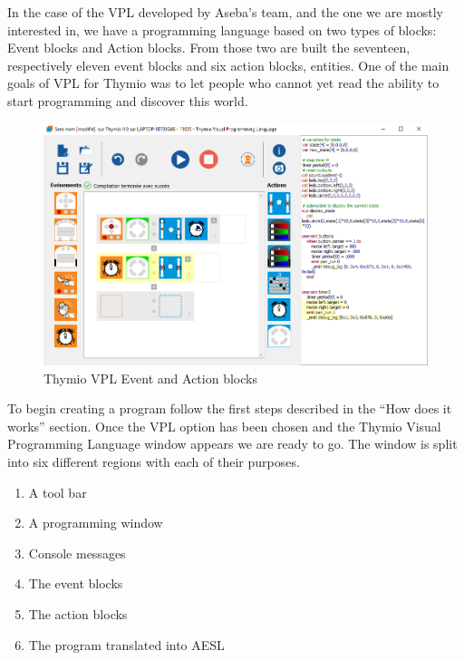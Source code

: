\documentclass{scrartcl}
\begin{document}
In the case of the VPL developed by Aseba’s team, and the one we are mostly interested in, we have a programming language based on two types of blocks: Event blocks and Action blocks. 
From those two are built the seventeen, respectively eleven event blocks and six action blocks, entities. 
One of the main goals of VPL for Thymio was to let people who cannot yet read the ability to start programming and discover this world.\\

\begin{figure}[h]
  \includegraphics[width=\textwidth]{Thymio_VPL_window}
  \caption{Thymio VPL Event and Action blocks}
  \label{fig:thymio_vpl_blocks}
\end{figure}

To begin creating a program follow the first steps described in the “How does it works” section. 
Once the VPL option has been chosen and the Thymio Visual Programming Language window appears we are ready to go. 
The window is split into six different regions with each of their purposes.
\begin{enumerate}
  \item A tool bar
  \item A programming window
  \item Console messages
  \item The event blocks
  \item The action blocks
  \item The program translated into AESL
\end{enumerate}
\end{document}
